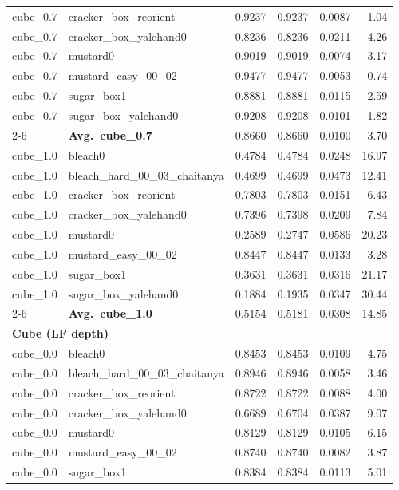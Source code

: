 \begin{longtable}{llrrrr}
  cube_0.7 & cracker\_box\_reorient & 0.9237 & 0.9237 & 0.0087 & 1.04 \\
  cube_0.7 & cracker\_box\_yalehand0 & 0.8236 & 0.8236 & 0.0211 & 4.26 \\
  cube_0.7 & mustard0 & 0.9019 & 0.9019 & 0.0074 & 3.17 \\
  cube_0.7 & mustard\_easy\_00\_02 & 0.9477 & 0.9477 & 0.0053 & 0.74 \\
  cube_0.7 & sugar\_box1 & 0.8881 & 0.8881 & 0.0115 & 2.59 \\
  cube_0.7 & sugar\_box\_yalehand0 & 0.9208 & 0.9208 & 0.0101 & 1.82 \\
  \cmidrule{2-6}
  & \textbf{Avg.~cube_0.7} & 0.8660 & 0.8660 & 0.0100 & 3.70 \\
  \midrule
  cube_1.0 & bleach0 & 0.4784 & 0.4784 & 0.0248 & 16.97 \\
  cube_1.0 & bleach\_hard\_00\_03\_chaitanya & 0.4699 & 0.4699 & 0.0473 & 12.41 \\
  cube_1.0 & cracker\_box\_reorient & 0.7803 & 0.7803 & 0.0151 & 6.43 \\
  cube_1.0 & cracker\_box\_yalehand0 & 0.7396 & 0.7398 & 0.0209 & 7.84 \\
  cube_1.0 & mustard0 & 0.2589 & 0.2747 & 0.0586 & 20.23 \\
  cube_1.0 & mustard\_easy\_00\_02 & 0.8447 & 0.8447 & 0.0133 & 3.28 \\
  cube_1.0 & sugar\_box1 & 0.3631 & 0.3631 & 0.0316 & 21.17 \\
  cube_1.0 & sugar\_box\_yalehand0 & 0.1884 & 0.1935 & 0.0347 & 30.44 \\
  \cmidrule{2-6}
  & \textbf{Avg.~cube_1.0} & 0.5154 & 0.5181 & 0.0308 & 14.85 \\
  \midrule
\multicolumn{6}{l}{\textbf{Cube (LF depth)}} \\
\midrule
  cube_0.0 & bleach0 & 0.8453 & 0.8453 & 0.0109 & 4.75 \\
  cube_0.0 & bleach\_hard\_00\_03\_chaitanya & 0.8946 & 0.8946 & 0.0058 & 3.46 \\
  cube_0.0 & cracker\_box\_reorient & 0.8722 & 0.8722 & 0.0088 & 4.00 \\
  cube_0.0 & cracker\_box\_yalehand0 & 0.6689 & 0.6704 & 0.0387 & 9.07 \\
  cube_0.0 & mustard0 & 0.8129 & 0.8129 & 0.0105 & 6.15 \\
  cube_0.0 & mustard\_easy\_00\_02 & 0.8740 & 0.8740 & 0.0082 & 3.87 \\
  cube_0.0 & sugar\_box1 & 0.8384 & 0.8384 & 0.0113 & 5.01 \\

\end{longtable}
